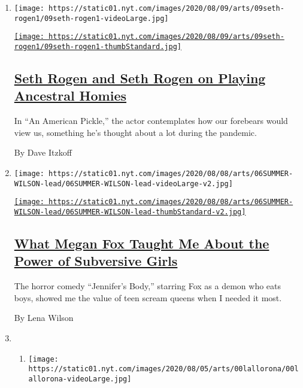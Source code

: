 \begin{enumerate}
\def\labelenumi{\arabic{enumi}.}
\item
  \texttt{[image: https://static01.nyt.com/images/2020/08/09/arts/09seth-rogen1/09seth-rogen1-videoLarge.jpg]}

  \href{/2020/08/05/movies/seth-rogen-american-pickle.html}{\texttt{[image: https://static01.nyt.com/images/2020/08/09/arts/09seth-rogen1/09seth-rogen1-thumbStandard.jpg]}}

  \hypertarget{seth-rogen-and-seth-rogen-on-playing-ancestral-homies}{%
  \subsection{\texorpdfstring{\href{/2020/08/05/movies/seth-rogen-american-pickle.html}{Seth
  Rogen and Seth Rogen on Playing Ancestral
  Homies}}{Seth Rogen and Seth Rogen on Playing Ancestral Homies}}\label{seth-rogen-and-seth-rogen-on-playing-ancestral-homies}}

  In ``An American Pickle,'' the actor contemplates how our forebears
  would view us, something he's thought about a lot during the pandemic.

  By Dave Itzkoff
\item
  \texttt{[image: https://static01.nyt.com/images/2020/08/08/arts/06SUMMER-WILSON-lead/06SUMMER-WILSON-lead-videoLarge-v2.jpg]}

  \href{/2020/08/06/movies/megan-fox-jennifers-body.html}{\texttt{[image: https://static01.nyt.com/images/2020/08/08/arts/06SUMMER-WILSON-lead/06SUMMER-WILSON-lead-thumbStandard-v2.jpg]}}

  \hypertarget{what-megan-fox-taught-me-about-the-power-of-subversive-girls}{%
  \subsection{\texorpdfstring{\href{/2020/08/06/movies/megan-fox-jennifers-body.html}{What
  Megan Fox Taught Me About the Power of Subversive
  Girls}}{What Megan Fox Taught Me About the Power of Subversive Girls}}\label{what-megan-fox-taught-me-about-the-power-of-subversive-girls}}

  The horror comedy ``Jennifer's Body,'' starring Fox as a demon who
  eats boys, showed me the value of teen scream queens when I needed it
  most.

  By Lena Wilson
\item
  \begin{enumerate}
  \def\labelenumii{\arabic{enumii}.}
  \item
    \texttt{[image: https://static01.nyt.com/images/2020/08/05/arts/00lallorona/00lallorona-videoLarge.jpg]}


\end{enumerate}
\end{enumerate}
